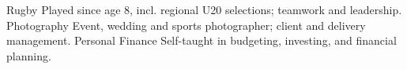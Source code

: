 



\begin{cvskills}
  \cvskill
    {Rugby} %
    {Played since age 8, incl. regional U20 selections; teamwork and leadership.}
  \cvskill
    {Photography} %
    {Event, wedding and sports photographer; client and delivery management.}
  \cvskill
    {Personal Finance} %
    {Self-taught in budgeting, investing, and financial planning.}
\end{cvskills}
